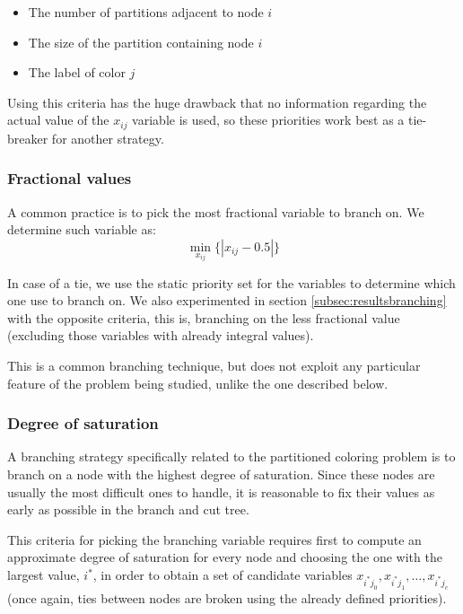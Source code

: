 \begin{itemize}
\item{The number of partitions adjacent to node $i$}
\item{The size of the partition containing node $i$}
\item{The label of color $j$}
\end{itemize}

Using this criteria has the huge drawback that no information regarding the actual value of the $x_{ij}$ variable is used, so these priorities work best as a tie-breaker for another strategy.

\subsubsection{Fractional values}
\label{subsubsec:alg:branch:frac}

A common practice is to pick the most fractional variable to branch on. We determine such variable as:
\[
\min_{x_{ij}} \{ |x_{ij} - 0.5| \}
\]

In case of a tie, we use the static priority set for the variables to determine which one use to branch on. We also experimented in section \ref{subsec:resultsbranching} with the opposite criteria, this is, branching on the less fractional value (excluding those variables with already integral values).

This is a common branching technique, but does not exploit any particular feature of the problem being studied, unlike the one described below.

\subsubsection{Degree of saturation}
\label{subsubsec:alg:branch:dsatur}

A branching strategy specifically related to the partitioned coloring problem is to branch on a node with the highest degree of saturation. Since these nodes are usually the most difficult ones to handle, it is reasonable to fix their values as early as possible in the branch and cut tree.

This criteria for picking the branching variable requires first to compute an approximate degree of saturation for every node and choosing the one with the largest value, $i^*$, in order to obtain a set of candidate variables $x_{i^*j_0}, x_{i^*j_1}, \ldots, x_{i^*j_c}$ (once again, ties between nodes are broken using the already defined priorities).

